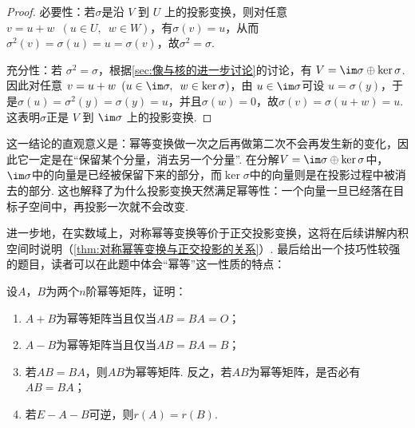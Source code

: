\begin{proof}
    必要性：若$\sigma$是沿 $V$ 到 $U$ 上的投影变换，则对任意$v=u+w\enspace(u\in U,\enspace w\in W)$，有$\sigma(v)=u$，从而$\sigma^2(v)=\sigma(u)=u=\sigma(v)$，故$\sigma^2=\sigma$.

    充分性：若 $\sigma^2 = \sigma$，根据\autoref{sec:像与核的进一步讨论}的讨论，有 $V = \im \sigma \oplus \ker \sigma$. 因此对任意 $v = u + w \enspace(u \in \im \sigma, \enspace w \in \ker \sigma)$，由 $u \in \im \sigma$可设 $u = \sigma(y)$，于是$\sigma(u)=\sigma^2(y)=\sigma(y)=u$，并且$\sigma(w)=0$，故$\sigma(v)=\sigma(u+w)=u$. 这表明$\sigma$正是 $V$ 到 $\im \sigma$ 上的投影变换.
\end{proof}

这一结论的直观意义是：幂等变换做一次之后再做第二次不会再发生新的变化，因此它一定是在``保留某个分量，消去另一个分量''. 在分解$V=\im \sigma\oplus\ker \sigma$中，$\im \sigma$中的向量是已经被保留下来的部分，而$\ker \sigma$中的向量则是在投影过程中被消去的部分. 这也解释了为什么投影变换天然满足幂等性：一个向量一旦已经落在目标子空间中，再投影一次就不会改变.

进一步地，在实数域上，对称幂等变换等价于正交投影变换，这将在后续讲解内积空间时说明（\autoref{thm:对称幂等变换与正交投影的关系}）. 最后给出一个技巧性较强的题目，读者可以在此题中体会``幂等''这一性质的特点：

\begin{example}{}{}
    设$A$，$B$为两个$n$阶幂等矩阵，证明：
    \begin{enumerate}
        \item $A+B$为幂等矩阵当且仅当$AB=BA=O$；

        \item $A-B$为幂等矩阵当且仅当$AB=BA=B$；

        \item 若$AB=BA$，则$AB$为幂等矩阵. 反之，若$AB$为幂等矩阵，是否必有$AB=BA$；

        \item 若$E-A-B$可逆，则$r(A)=r(B)$.
    \end{enumerate}
\end{example}

